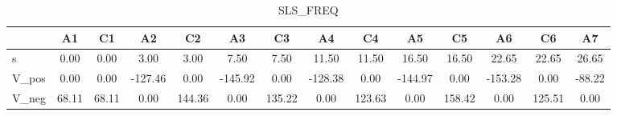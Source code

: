 \begin{table}[H]
\caption{SLS_FREQ}
\begin{tabular}{lSSSSSSSSSSSSS}
\toprule
{} & {A1} & {C1} & {A2} & {C2} & {A3} & {C3} & {A4} & {C4} & {A5} & {C5} & {A6} & {C6} & {A7} \\
\midrule
s & 0.00 & 0.00 & 3.00 & 3.00 & 7.50 & 7.50 & 11.50 & 11.50 & 16.50 & 16.50 & 22.65 & 22.65 & 26.65 \\
V_pos & 0.00 & 0.00 & -127.46 & 0.00 & -145.92 & 0.00 & -128.38 & 0.00 & -144.97 & 0.00 & -153.28 & 0.00 & -88.22 \\
V_neg & 68.11 & 68.11 & 0.00 & 144.36 & 0.00 & 135.22 & 0.00 & 123.63 & 0.00 & 158.42 & 0.00 & 125.51 & 0.00 \\
\bottomrule
\end{tabular}
\end{table}
